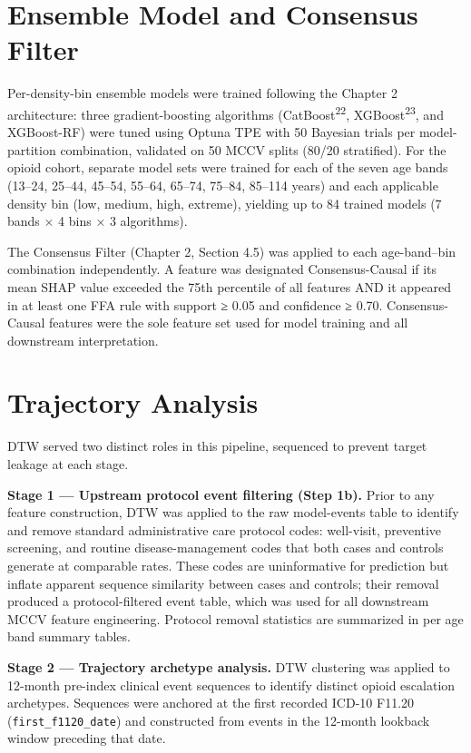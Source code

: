 \documentclass[
  12pt,
]{book}
\begin{document}
\section{Ensemble Model and Consensus
Filter}\label{ensemble-model-and-consensus-filter}

Per-density-bin ensemble models were trained following the Chapter 2
architecture: three gradient-boosting algorithms
(CatBoost\textsuperscript{22}, XGBoost\textsuperscript{23}, and
XGBoost-RF) were tuned using Optuna TPE with 50 Bayesian trials per
model-partition combination, validated on 50 MCCV splits (80/20
stratified). For the opioid cohort, separate model sets were trained for
each of the seven age bands (13--24, 25--44, 45--54, 55--64, 65--74,
75--84, 85--114 years) and each applicable density bin (low, medium,
high, extreme), yielding up to 84 trained models (7 bands × 4 bins × 3
algorithms).

The Consensus Filter (Chapter 2, Section 4.5) was applied to each
age-band--bin combination independently. A feature was designated
Consensus-Causal if its mean \textbar SHAP\textbar{} value exceeded the
75th percentile of all features AND it appeared in at least one FFA rule
with support ≥ 0.05 and confidence ≥ 0.70. Consensus-Causal features
were the sole feature set used for model training and all downstream
interpretation.

\section{Trajectory Analysis}\label{sec-trajectory}

DTW served two distinct roles in this pipeline, sequenced to prevent
target leakage at each stage.

\textbf{Stage 1 --- Upstream protocol event filtering (Step 1b).} Prior
to any feature construction, DTW was applied to the raw model-events
table to identify and remove standard administrative care protocol
codes: well-visit, preventive screening, and routine disease-management
codes that both cases and controls generate at comparable rates. These
codes are uninformative for prediction but inflate apparent sequence
similarity between cases and controls; their removal produced a
protocol-filtered event table, which was used for all downstream MCCV
feature engineering. Protocol removal statistics are summarized in per
age band summary tables.

\textbf{Stage 2 --- Trajectory archetype analysis.} DTW clustering was
applied to 12-month pre-index clinical event sequences to identify
distinct opioid escalation archetypes. Sequences were anchored at the
first recorded ICD-10 F11.20 (\texttt{first\_f1120\_date}) and
constructed from events in the 12-month lookback window preceding that
date.
\end{document}

